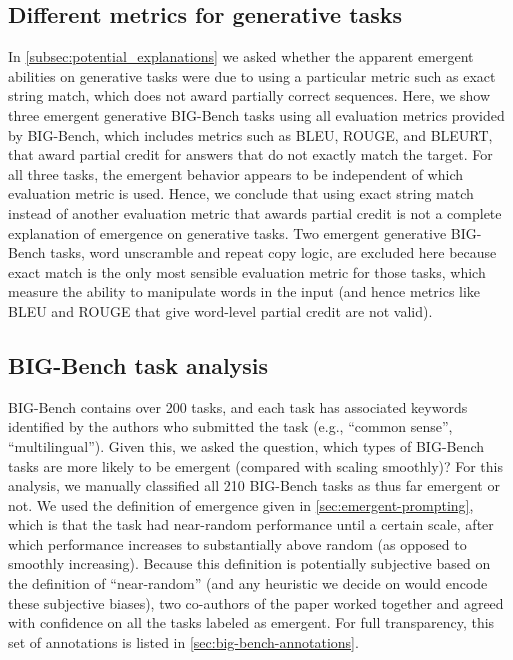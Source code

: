 \clearpage
\subsection{Different metrics for generative tasks}\label{subsec:different-metrics}

In \cref{subsec:potential_explanations} we asked whether the apparent emergent abilities on generative tasks were due to using a particular metric such as exact string match, which does not award partially correct sequences. 
Here, we show three emergent generative BIG-Bench tasks using all evaluation metrics provided by BIG-Bench, which includes metrics such as BLEU, ROUGE, and BLEURT, that award partial credit for answers that do not exactly match the target.
For all three tasks, the emergent behavior appears to be independent of which evaluation metric is used.
Hence, we conclude that using exact string match instead of another evaluation metric that awards partial credit is not a complete explanation of emergence on generative tasks.
Two emergent generative BIG-Bench tasks, word unscramble and repeat copy logic, are excluded here because exact match is the only most sensible evaluation metric for those tasks, which measure the ability to manipulate words in the input (and hence metrics like BLEU and ROUGE that give word-level partial credit are not valid).



\subsection{BIG-Bench task analysis}\label{subsec:big-bench-task-analysis}

BIG-Bench contains over 200 tasks, and each task has associated keywords identified by the authors who submitted the task (e.g., ``common sense'', ``multilingual'').
Given this, we asked the question, which types of BIG-Bench tasks are more likely to be emergent (compared with scaling smoothly)? 
For this analysis, we manually classified all 210 BIG-Bench tasks as thus far emergent or not.
We used the definition of emergence given in \cref{sec:emergent-prompting}, which is that the task had near-random performance until a certain scale, after which performance increases to substantially above random (as opposed to smoothly increasing). 
Because this definition is potentially subjective based on the definition of ``near-random'' (and any heuristic we decide on would encode these subjective biases), two co-authors of the paper worked together and agreed with confidence on all the tasks labeled as emergent.
For full transparency, this set of annotations is listed in \cref{sec:big-bench-annotations}.

